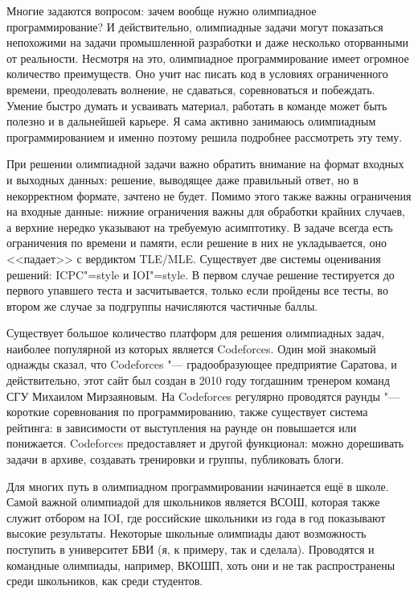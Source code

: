 \documentclass[10pt]{article}
\begin{document}
\newpage
Многие задаются вопросом: зачем вообще нужно олимпиадное программирование? И действительно, олимпиадные задачи могут показаться непохожими на задачи промышленной разработки и даже несколько оторванными от реальности. Несмотря на это, олимпиадное программирование имеет огромное количество преимуществ. Оно учит нас писать код в условиях ограниченного времени, преодолевать волнение, не сдаваться, соревноваться и побеждать. Умение быстро думать и усваивать материал, работать в команде может быть полезно и в дальнейшей карьере. Я сама активно занимаюсь олимпиадным программированием и именно поэтому решила подробнее рассмотреть эту тему.

При решении олимпиадной задачи важно обратить внимание на формат входных и выходных данных: решение, выводящее даже правильный ответ, но в некорректном формате, зачтено не будет. Помимо этого также важны ограничения на входные данные: нижние ограничения важны для обработки крайних случаев, а верхние нередко указывают на требуемую асимптотику. В задаче всегда есть ограничения по времени и памяти, если решение в них не укладывается, оно <<падает>> с вердиктом TLE/MLE. Существует две системы оценивания решений: ICPC"=style и IOI"=style. В первом случае решение тестируется до первого упавшего теста и засчитывается, только если пройдены все тесты, во втором же случае за подгруппы начисляются частичные баллы.

Существует большое количество платформ для решения олимпиадных задач, наиболее популярной из которых является Codeforces. Один мой знакомый однажды сказал, что Codeforces "--- градообразующее предприятие Саратова, и действительно, этот сайт был создан в 2010 году тогдашним тренером команд СГУ Михаилом Мирзаяновым. На Codeforces регулярно проводятся раунды "--- короткие соревнования по программированию, также существует система рейтинга: в зависимости от выступления на раунде он повышается или понижается. Codeforces предоставляет и другой функционал: можно дорешивать задачи в архиве, создавать тренировки и группы, публиковать блоги.

Для многих путь в олимпиадном программировании начинается ещё в школе. Самой важной олимпиадой для школьников является ВСОШ, которая также служит отбором на IOI, где российские школьники из года в год показывают высокие результаты. Некоторые школьные олимпиады дают возможность поступить в университет БВИ (я, к примеру, так и сделала). Проводятся и командные олимпиады, например, ВКОШП, хоть они и не так распространены среди школьников, как среди студентов.
\end{document}
